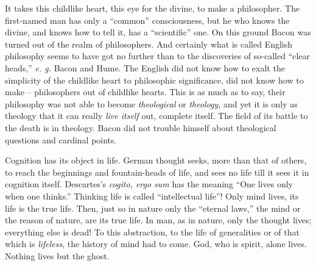 \documentclass[12pt,a4paper]{book}
\begin{document}
\noindent{}It takes this childlike heart, this eye for the divine, to make a 
philosopher. The first-named man has only a ``common'' consciousness, but he 
who knows the divine, and knows how to tell it, has a ``scientific'' one. On 
this ground Bacon was turned out of the realm of philosophers. And certainly 
what is called English philosophy seems to have got no further than to the 
discoveries of so-called ``clear heads,'' \textit{e. g.} Bacon and Hume. The 
English did not know how to exalt the simplicity of the childlike heart to 
philosophic significance, did not know how to make -- philosophers out of 
childlike hearts. This is as much as to say, their philosophy was not able to 
become \textit{theological} or \textit{theology}, and yet it is only as 
theology that it can really \textit{live itself} out, complete itself. The 
field of its battle to the death is in theology. Bacon did not trouble himself 
about theological questions and cardinal points.

Cognition has its object in life. German thought seeks, more than that of 
others, to reach the beginnings and fountain-heads of life, and sees no life 
till it sees it in cognition itself. Descartes's \textit{cogito, ergo sum} has 
the meaning ``One lives only when one thinks.'' Thinking life is called 
``intellectual life''! Only mind lives, its life is the true life. Then, 
just so in nature only the ``eternal laws,'' the mind or the reason of 
nature, are its true life. In man, as in nature, only the thought lives; 
everything else is dead! To this abstraction, to the life of generalities or 
of that which is \textit{lifeless}, the history of mind had to come. God, who 
is spirit, alone lives. Nothing lives but the ghost.
\end{document}
